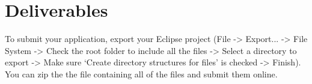 \section{Deliverables}

To submit your application, export your Eclipse project (File -> Export... -> File System -> Check the root folder to include all the files -> Select a directory to export -> Make sure ‘Create directory structures for files’ is checked -> Finish).
You can zip the the file containing all of the files and submit them online.
